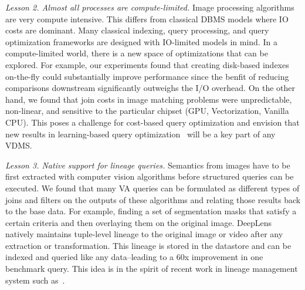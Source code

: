 \vspace{0.5em} \noindent \emph{Lesson 2. Almost all processes are compute-limited. }
Image processing algorithms are very compute intensive. This differs from classical DBMS models where IO costs are dominant. 
Many classical indexing, query processing, and query optimization frameworks are designed with IO-limited models in mind.
In a compute-limited world, there is a new space of optimizations that can be explored.
For example, our experiments found that creating disk-based indexes on-the-fly could substantially improve performance since the benfit of reducing comparisons downstream significantly outweighs the I/O overhead.
On the other hand, we found that join costs in image matching problems were unpredictable, non-linear, and sensitive to the particular chipset (GPU, Vectorization, Vanilla CPU).
This poses a challenge for cost-based query optimization and envision that new results in learning-based query optimization~\cite{kaftan2018cuttlefish,krishnan2018deeprljoins} will be a key part of any VDMS.

\vspace{0.5em} \noindent \emph{Lesson 3. Native support for lineage queries. } Semantics from images have to be first extracted with computer vision algorithms before structured queries can be executed. We found that many VA queries can be formulated as different types of joins and filters on the outputs of these algorithms and relating those results back to the base data. For example, finding a set of segmentation masks that satisfy a certain criteria and then overlaying them on the original image.
\textsf{DeepLens} natively maintains tuple-level lineage to the original image or video after any extraction or transformation. This lineage is stored in the datastore and can be indexed and queried like any data--leading to a 60x improvement in one benchmark query.
This idea is in the spirit of recent work in lineage management system such as~\cite{psallidas2018smoke}.


\vspace{0.75em}

